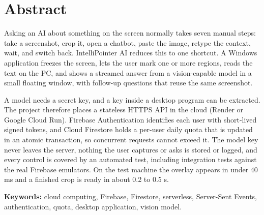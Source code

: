 \chapter*{Abstract}
Asking an AI about something on the screen normally takes seven manual steps: take a
screenshot, crop it, open a chatbot, paste the image, retype the context, wait, and switch
back. IntelliPointer AI reduces this to one shortcut. A Windows application freezes the
screen, lets the user mark one or more regions, reads the text on the PC, and shows a streamed
answer from a vision-capable model in a small floating window, with follow-up questions that
reuse the same screenshot.

A model needs a secret key, and a key inside a desktop program can be extracted. The project
therefore places a stateless HTTPS API in the cloud (Render or Google Cloud Run). Firebase
Authentication identifies each user with short-lived signed tokens, and Cloud Firestore holds
a per-user daily quota that is updated in an atomic transaction, so concurrent requests cannot
exceed it. The model key never leaves the server, nothing the user captures or asks is stored
or logged, and every control is covered by an automated test, including integration tests
against the real Firebase emulators. On the test machine the overlay appears in under 40 ms
and a finished crop is ready in about 0.2 to 0.5 s.

\bigskip
\noindent\textbf{Keywords:} cloud computing, Firebase, Firestore, serverless, Server-Sent
Events, authentication, quota, desktop application, vision model.
\clearpage
